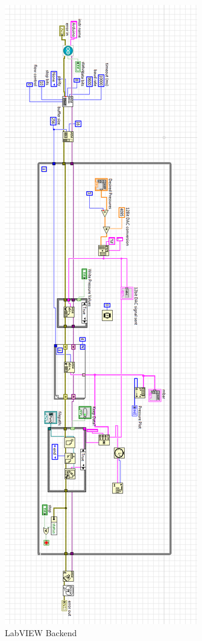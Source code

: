 \begin{figure}[h]
\centering 
\includegraphics[width=01.0\columnwidth]{backend1.PNG} 
\caption[LabVIEW Backend True]{LabVIEW Backend} 
\label{fig:backend1} 
\end{figure}

